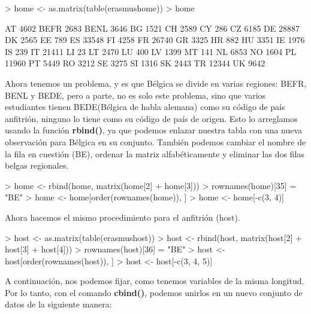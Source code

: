 \documentclass [a4paper] {article}
\begin{document}
\begin{Schunk}
\begin{Sinput}
> home <- as.matrix(table(erasmushome))
> home
\end{Sinput}
\begin{Soutput}
      [,1]
AT    4602
BEFR  2683
BENL  3646
BG    1521
CH    2589
CY     286
CZ    6185
DE   28887
DK    2565
EE     789
ES   33548
FI    4258
FR   26740
GR    3325
HR     882
HU    3351
IE    1976
IS     239
IT   21411
LI      23
LT    2470
LU     400
LV    1399
MT     141
NL    6853
NO    1604
PL   11960
PT    5449
RO    3212
SE    3275
SI    1316
SK    2443
TR   12344
UK    9642
\end{Soutput}
\end{Schunk}

Ahora tenemos un problema, y es que Bélgica se divide en varias regiones: BEFR, BENL y BEDE, 
pero a parte, no es solo este problema, sino que varios estudiantes tienen BEDE(Bélgica de
habla alemana) como su código de país anfitrión, ninguno lo tiene como su código de país de
origen. Esto lo arreglamos usando la función \textbf{rbind()}, ya que podemos enlazar nuestra
tabla con una nueva observación para Bélgica en su conjunto. También podemos cambiar el nombre 
de la fila en cuestión (BE), ordenar la matriz alfabéticamente y eliminar las dos filas belgas
regionales.

\begin{Schunk}
\begin{Sinput}
> home <- rbind(home, matrix(home[2] + home[3]))
> rownames(home)[35] = "BE"
> home <- home[order(rownames(home)), ]
> home <- home[-c(3, 4)]
\end{Sinput}
\end{Schunk}

Ahora hacemos el mismo procedimiento para el anfitrión (host).

\begin{Schunk}
\begin{Sinput}
> host <- as.matrix(table(erasmushost))
> host <- rbind(host, matrix(host[2] + host[3] + host[4]))
> rownames(host)[36] = "BE"
> host <- host[order(rownames(host)), ]
> host <- host[-c(3, 4, 5)]
\end{Sinput}
\end{Schunk}

A continuación, nos podemos fijar, como tenemos variables de la misma longitud. Por lo tanto,
con el comando \textbf{cbind()}, podemos unirlos en un nuevo conjunto de datos de la siguiente
manera:
\end{document}
